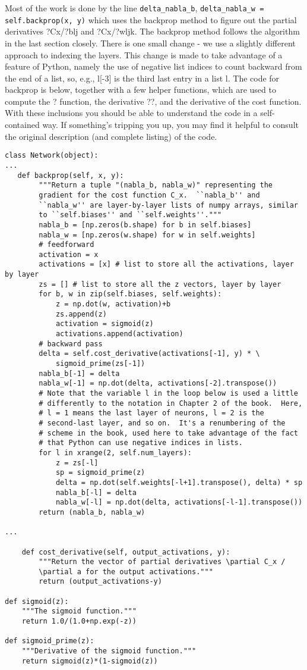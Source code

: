 Most of the work is done by the line \lstinline{delta_nabla_b}, \lstinline{delta_nabla_w = self.backprop(x, y)} which uses the backprop method to figure out the partial derivatives ?Cx/?blj and ?Cx/?wljk. The backprop method follows the algorithm in the last section closely. There is one small change - we use a slightly different approach to indexing the layers. This change is made to take advantage of a feature of Python, namely the use of negative list indices to count backward from the end of a list, so, e.g., l[-3] is the third last entry in a list l. The code for backprop is below, together with a few helper functions, which are used to compute the ? function, the derivative ??, and the derivative of the cost function. With these inclusions you should be able to understand the code in a self-contained way. If something's tripping you up, you may find it helpful to consult the original description (and complete listing) of the code. 
\begin{lstlisting}
class Network(object):
...
   def backprop(self, x, y):
        """Return a tuple "(nabla_b, nabla_w)" representing the
        gradient for the cost function C_x.  ``nabla_b'' and
        ``nabla_w'' are layer-by-layer lists of numpy arrays, similar
        to ``self.biases'' and ``self.weights''."""
        nabla_b = [np.zeros(b.shape) for b in self.biases]
        nabla_w = [np.zeros(w.shape) for w in self.weights]
        # feedforward
        activation = x
        activations = [x] # list to store all the activations, layer by layer
        zs = [] # list to store all the z vectors, layer by layer
        for b, w in zip(self.biases, self.weights):
            z = np.dot(w, activation)+b
            zs.append(z)
            activation = sigmoid(z)
            activations.append(activation)
        # backward pass
        delta = self.cost_derivative(activations[-1], y) * \
            sigmoid_prime(zs[-1])
        nabla_b[-1] = delta
        nabla_w[-1] = np.dot(delta, activations[-2].transpose())
        # Note that the variable l in the loop below is used a little
        # differently to the notation in Chapter 2 of the book.  Here,
        # l = 1 means the last layer of neurons, l = 2 is the
        # second-last layer, and so on.  It's a renumbering of the
        # scheme in the book, used here to take advantage of the fact
        # that Python can use negative indices in lists.
        for l in xrange(2, self.num_layers):
            z = zs[-l]
            sp = sigmoid_prime(z)
            delta = np.dot(self.weights[-l+1].transpose(), delta) * sp
            nabla_b[-l] = delta
            nabla_w[-l] = np.dot(delta, activations[-l-1].transpose())
        return (nabla_b, nabla_w)

...

    def cost_derivative(self, output_activations, y):
        """Return the vector of partial derivatives \partial C_x /
        \partial a for the output activations."""
        return (output_activations-y) 

def sigmoid(z):
    """The sigmoid function."""
    return 1.0/(1.0+np.exp(-z))

def sigmoid_prime(z):
    """Derivative of the sigmoid function."""
    return sigmoid(z)*(1-sigmoid(z))
\end{lstlisting}

